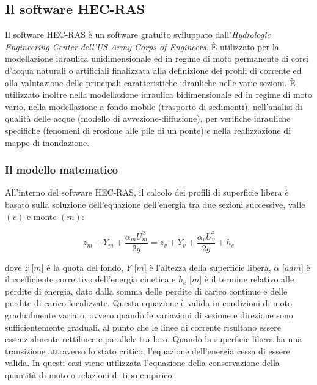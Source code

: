 \documentclass[12pt]{article} %
\begin{document}
\newpage

\subsection{Il software HEC-RAS}

\noindent Il software HEC-RAS è un software gratuito sviluppato dall’\textit{Hydrologic Engineering Center} \textit{dell’US Army Corps of Engineers}. È utilizzato per la modellazione idraulica unidimensionale ed in regime di moto permanente di corsi d’acqua naturali o artificiali finalizzata alla definizione dei profili di corrente ed alla valutazione delle principali caratteristiche idrauliche nelle varie sezioni. È utilizzato inoltre nella modellazione idraulica bidimensionale ed in regime di moto vario, nella modellazione a fondo mobile (trasporto di sedimenti), nell’analisi di qualità delle acque (modello di avvezione-diffusione), per verifiche idrauliche specifiche (fenomeni di erosione alle pile di un ponte) e nella realizzazione di mappe di inondazione. 

\subsubsection{Il modello matematico}

\noindent All’interno del software HEC-RAS, il calcolo dei profili di superficie libera è basato sulla soluzione dell’equazione dell’energia tra due sezioni successive, valle $(v)$ e monte $(m)$:

\begin{equation}
    z_m+Y_m+\frac{\alpha_mU_m^2}{2g}=z_v+Y_v+\frac{\alpha_vU_v^2}{2g}+h_e
    \label{eqn:Bernoulli}
\end{equation}

\noindent dove $z$ [$m$] è la quota del fondo, $Y$ [$m$] è l’altezza della superficie libera, $\alpha$ [$adm$] è il coefficiente correttivo dell’energia cinetica e $h_e$ [$m$] è il termine relativo alle perdite di energia, dato dalla somma delle perdite di carico continue e delle perdite di carico localizzate. 
Questa equazione è valida in condizioni di moto gradualmente variato, ovvero quando le variazioni di sezione e direzione sono sufficientemente graduali, al punto che le linee di corrente risultano essere essenzialmente rettilinee e parallele tra loro.
Quando la superficie libera ha una transizione attraverso lo stato critico, l’equazione dell’energia cessa di essere valida. In questi casi viene utilizzata l’equazione della conservazione della quantità di moto o relazioni di tipo empirico.
\end{document}
